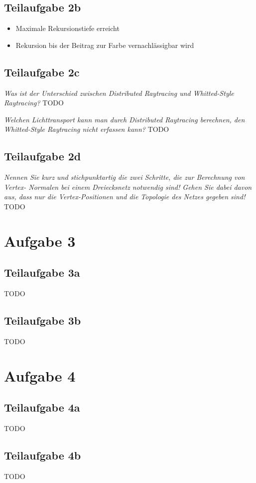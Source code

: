 \documentclass[a4paper]{scrartcl}
\begin{document}
\subsection*{Teilaufgabe 2b}
\begin{itemize}
    \item Maximale Rekursionstiefe erreicht
    \item Rekursion bis der Beitrag zur Farbe vernachlässigbar wird
\end{itemize}

\subsection*{Teilaufgabe 2c}

\textit{Was ist der Unterschied zwischen Distributed Raytracing und Whitted-Style Raytracing?}
TODO

\textit{Welchen Lichttransport kann man durch Distributed Raytracing berechnen, den
Whitted-Style Raytracing nicht erfassen kann?}
TODO

\subsection*{Teilaufgabe 2d}
\textit{Nennen Sie kurz und stichpunktartig die zwei Schritte, die zur Berechnung von Vertex-
Normalen bei einem Dreiecksnetz notwendig sind! Gehen Sie dabei davon aus, dass nur
die Vertex-Positionen und die Topologie des Netzes gegeben sind!}
TODO

\section*{Aufgabe 3}
\subsection*{Teilaufgabe 3a}
TODO
\subsection*{Teilaufgabe 3b}
TODO

\section*{Aufgabe 4}
\subsection*{Teilaufgabe 4a}
TODO
\subsection*{Teilaufgabe 4b}
TODO
\end{document}
